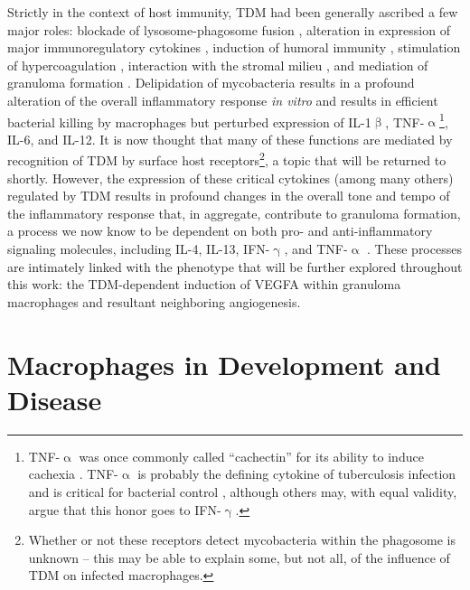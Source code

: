Strictly in the context of host immunity, TDM had been generally ascribed a few major roles: blockade of lysosome\hyp{}phagosome fusion \citep{Indrigo2003, Patin2017b, Axelrod2008}, alteration in expression of major immunoregulatory cytokines \citep{Indrigo2002, Bowdish2009, Perez2000, Sakamoto2013}, induction of humoral immunity \citep{Ryll2001, Fujiwara1999, Fujita2005}, stimulation of hypercoagulation \citep{Donnachie2016, Retzinger1982, Retzinger1987}, interaction with the stromal milieu \citep{Sakamoto2010}, and mediation of granuloma formation \citep{Bekierkunst1968, Hunter2006b, Lee2012}. Delipidation of mycobacteria results in a profound alteration of the overall inflammatory response \textit{in vitro} and results in efficient bacterial killing by macrophages but perturbed expression of IL\hyp{}1$\upbeta$, TNF\hyp{}$\upalpha$\footnote{TNF\hyp{}$\upalpha$ was once commonly called ``cachectin'' for its ability to induce cachexia \citep{Tracey1988}. TNF\hyp{}$\upalpha$ is probably the defining cytokine of tuberculosis infection and is critical for bacterial control \citep{Orme1998}, although others may, with equal validity, argue that this honor goes to IFN\hyp{}$\upgamma$.}, IL\hyp{}6, and IL\hyp{}12. It is now thought that many of these functions are mediated by recognition of TDM by surface host receptors\footnote{Whether or not these receptors detect mycobacteria within the phagosome is unknown -- this may be able to explain some, but not all, of the influence of TDM on infected macrophages.}, a topic that will be returned to shortly. However, the expression of these critical cytokines (among many others) regulated by TDM results in profound changes in the overall tone and tempo of the inflammatory response that, in aggregate, contribute to granuloma formation, a process we now know to be dependent on both pro\hyp{} and anti\hyp{}inflammatory signaling molecules, including IL\hyp{}4, IL\hyp{}13, IFN\hyp{}$\upgamma$, and TNF\hyp{}$\upalpha$ \citep{Cronan2021, Cavalcanti2012, Flynn1993, Cooper1993, Kaneko1999, Bergeron1997, Akdis2011}. These processes are intimately linked with the phenotype that will be further explored throughout this work: the TDM\hyp{}dependent induction of VEGFA within granuloma macrophages and resultant neighboring angiogenesis.

\section{Macrophages in Development and Disease}\label{macrophages}

